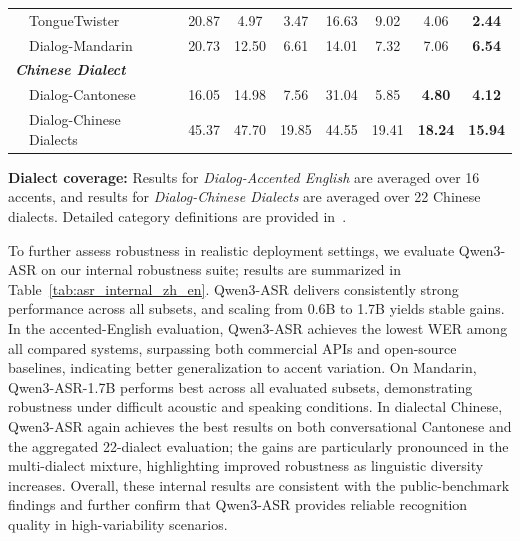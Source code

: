 \begin{table}[ht]
\begin{threeparttable}
{\begin{tabular}{@{}clccccc|cc@{}}
& TongueTwister    & 20.87 & 4.97  & 3.47  & 16.63 & 9.02  & 4.06 & \textbf{2.44} \\
& Dialog-Mandarin & 20.73 & 12.50 & 6.61  & 14.01 & 7.32  & 7.06 & \textbf{6.54} \\
\midrule
\multicolumn{9}{l}{\textit{\textbf{Chinese Dialect}}} \\ \midrule
& Dialog-Cantonese             & 16.05 & 14.98 & 7.56  & 31.04 & 5.85  & \textbf{4.80} & \textbf{4.12} \\
& Dialog-Chinese Dialects  & 45.37 & 47.70 & 19.85 & 44.55 & 19.41 & \textbf{18.24} & \textbf{15.94} \\
\bottomrule
\end{tabular}%
}
\begin{tablenotes}[flushleft]
\footnotesize
\begin{minipage}{\textwidth}
\item \textbf{Dialect coverage:} Results for \textit{Dialog-Accented English} are averaged over 16 accents, and results for \textit{Dialog-Chinese Dialects} are averaged over 22 Chinese dialects. Detailed category definitions are provided in~.
\end{minipage}
\end{tablenotes}

\end{threeparttable}
\end{table}

To further assess robustness in realistic deployment settings, we evaluate Qwen3-ASR on our internal robustness suite; results are summarized in Table~\ref{tab:asr_internal_zh_en}. Qwen3-ASR delivers consistently strong performance across all subsets, and scaling from 0.6B to 1.7B yields stable gains. In the accented-English evaluation, Qwen3-ASR achieves the lowest WER among all compared systems, surpassing both commercial APIs and open-source baselines, indicating better generalization to accent variation. On Mandarin, Qwen3-ASR-1.7B performs best across all evaluated subsets, demonstrating robustness under difficult acoustic and speaking conditions. In dialectal Chinese, Qwen3-ASR again achieves the best results on both conversational Cantonese and the aggregated 22-dialect evaluation; the gains are particularly pronounced in the multi-dialect mixture, highlighting improved robustness as linguistic diversity increases. Overall, these internal results are consistent with the public-benchmark findings and further confirm that Qwen3-ASR provides reliable recognition quality in high-variability scenarios.


